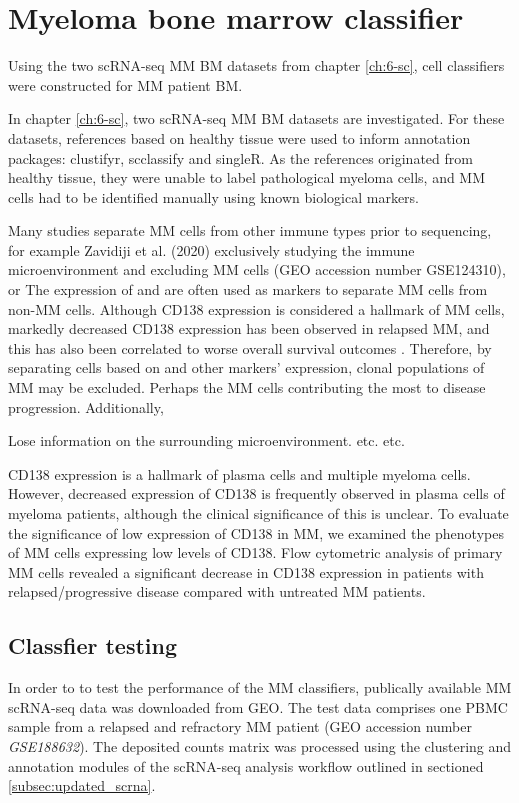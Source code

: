 \section{Myeloma bone marrow classifier}\label{sec:MM_classifier}

Using the two scRNA-seq MM BM datasets from chapter \ref{ch:6-sc}, cell classifiers were constructed for MM patient BM\@.


In chapter \ref{ch:6-sc}, two scRNA-seq MM BM datasets are investigated.
For these datasets, references based on healthy tissue were used to inform annotation packages: clustifyr, scclassify and singleR.
As the references originated from healthy tissue, they were unable to label pathological myeloma cells, and MM cells had to be identified manually using known biological markers.

Many studies separate MM cells from other immune types prior to sequencing, for example Zavidiji et al. (2020) exclusively studying the immune microenvironment and excluding MM cells (GEO accession number GSE124310)\cite{zavidij2020single}, or 
The expression of  and  are often used as markers to separate MM cells from non-MM cells.
Although CD138 expression is considered a hallmark of MM cells, markedly decreased CD138 expression has been observed in relapsed MM, and this has also been correlated to worse overall survival outcomes \cite{kawano2012multiple}.
Therefore, by separating cells based on  and other markers' expression, clonal populations of MM may be excluded.
Perhaps the MM cells contributing the most to disease progression.
Additionally,

Lose information on the surrounding microenvironment.
etc. etc.

CD138 expression is a hallmark of plasma cells and multiple myeloma cells. However, decreased expression of CD138 is frequently observed in plasma cells of myeloma patients, although the clinical significance of this is unclear. To evaluate the significance of low expression of CD138 in MM, we examined the phenotypes of MM cells expressing low levels of CD138. Flow cytometric analysis of primary MM cells revealed a significant decrease in CD138 expression in patients with relapsed/progressive disease compared with untreated MM patients. \cite{kawano2012multiple}

\subsection{Classfier testing}
In order to to test the performance of the MM classifiers, publically available MM scRNA-seq data was downloaded from GEO\@.
The test data comprises one PBMC sample from a relapsed and refractory MM patient (GEO accession number \textit{GSE188632}).
The deposited counts matrix was processed using the clustering and annotation modules of the scRNA-seq analysis workflow outlined in sectioned \ref{subsec:updated_scrna}.

